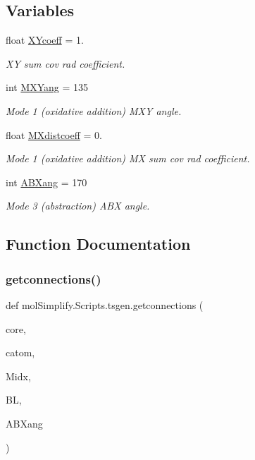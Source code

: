 \subsection*{Variables}
\begin{DoxyCompactItemize}
\item 
float \hyperlink{namespacemolSimplify_1_1Scripts_1_1tsgen_a0d48d88fd33cd358c1207a60f8db09fa}{X\+Ycoeff} = 1.
\begin{DoxyCompactList}\small\item\em XY sum cov rad coefficient. \end{DoxyCompactList}\item 
int \hyperlink{namespacemolSimplify_1_1Scripts_1_1tsgen_a27e6b63f27d41cb0442aa856b6743533}{M\+X\+Yang} = 135
\begin{DoxyCompactList}\small\item\em Mode 1 (oxidative addition) M\+XY angle. \end{DoxyCompactList}\item 
float \hyperlink{namespacemolSimplify_1_1Scripts_1_1tsgen_a15badf85c643c7785a7c5603154e2b67}{M\+Xdistcoeff} = 0.
\begin{DoxyCompactList}\small\item\em Mode 1 (oxidative addition) MX sum cov rad coefficient. \end{DoxyCompactList}\item 
int \hyperlink{namespacemolSimplify_1_1Scripts_1_1tsgen_a04e8e706dd6866bed934574a55c5960a}{A\+B\+Xang} = 170
\begin{DoxyCompactList}\small\item\em Mode 3 (abstraction) A\+BX angle. \end{DoxyCompactList}\end{DoxyCompactItemize}


\subsection{Function Documentation}
\mbox{\label{namespacemolSimplify_1_1Scripts_1_1tsgen_a87681ac0a98980187ecb8cd451419539}} 
\subsubsection{\texorpdfstring{getconnections()}{getconnections()}}
{\footnotesize\ttfamily def mol\+Simplify.\+Scripts.\+tsgen.\+getconnections (\begin{DoxyParamCaption}\item[{}]{core,  }\item[{}]{catom,  }\item[{}]{Midx,  }\item[{}]{BL,  }\item[{}]{A\+B\+Xang }\end{DoxyParamCaption})}



